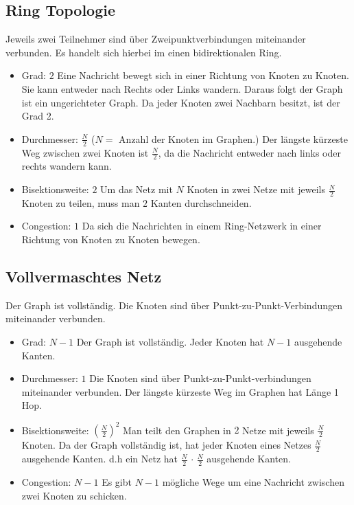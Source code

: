 \subsection{Ring Topologie}
 Jeweils zwei Teilnehmer sind über Zweipunktverbindungen miteinander verbunden.
 Es handelt sich hierbei im einen bidirektionalen Ring.
\begin{itemize}
  \item Grad: $2$
  \newline Eine Nachricht bewegt sich in einer Richtung von Knoten zu Knoten.
  Sie kann entweder nach Rechts oder Links wandern. Daraus folgt der Graph ist
  ein ungerichteter Graph. Da jeder Knoten zwei Nachbarn besitzt, ist der Grad 2.
  \item Durchmesser: $\frac{N}{2}$ ($N =$ Anzahl der Knoten im Graphen.)
   \newline Der längste kürzeste Weg zwischen zwei Knoten ist $\frac{N}{2}$, da
   die Nachricht entweder nach links oder rechts wandern kann.
  \item Bisektionsweite: $2$
  \newline  Um das Netz mit $N$ Knoten in zwei Netze mit jeweils $\frac{N}{2}$
  Knoten zu teilen, muss man $2$ Kanten durchschneiden.
  \item Congestion: $1$
  \newline Da sich die Nachrichten in einem Ring-Netzwerk in einer Richtung von
  Knoten zu Knoten bewegen.
\end{itemize}

\subsection{Vollvermaschtes Netz}
Der Graph ist vollständig. Die Knoten sind über Punkt-zu-Punkt-Verbindungen
miteinander verbunden.
\begin{itemize}
  \item Grad: $N-1$
  \newline Der Graph ist vollständig. Jeder Knoten hat $N-1$ ausgehende Kanten.
  \item Durchmesser: $1$
   \newline Die Knoten sind über Punkt-zu-Punkt-verbindungen miteinander
   verbunden. Der längste kürzeste Weg  im Graphen hat Länge 1 Hop.
  \item Bisektionsweite: $ \left( \frac{N}{2}\right)^2$
  \newline Man teilt den Graphen in $2$ Netze mit jeweils $\frac{N}{2}$ Knoten.
  Da der Graph vollständig ist, hat jeder Knoten eines Netzes  $\frac{N}{2}$
  ausgehende Kanten. d.h ein Netz hat $\frac{N}{2} \, \cdot \, \frac{N}{2}$
  ausgehende Kanten.
  \item Congestion: $N-1$
  \newline Es gibt $N-1$ mögliche Wege um eine Nachricht zwischen zwei Knoten zu
  schicken.
\end{itemize}


